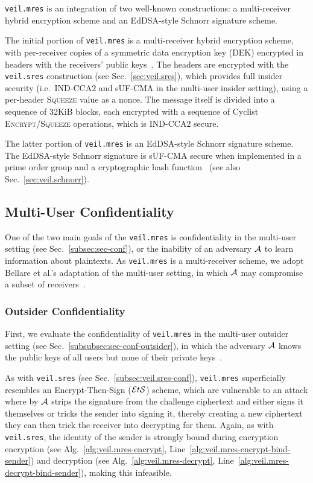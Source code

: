 \texttt{veil.mres} is an integration of two well-known constructions: a multi-receiver hybrid encryption scheme and an
EdDSA-style Schnorr signature scheme.

The initial portion of \texttt{veil.mres} is a multi-receiver hybrid encryption scheme, with per-receiver copies of a
symmetric data encryption key \@(DEK) encrypted in headers with the receivers' public
keys~\cite{kurosawa2002, bellare2003, bellare2007, rfc4880}\@.
The headers are encrypted with the \texttt{veil.sres} construction (see Sec.~\ref{sec:veil.sres}), which provides full
insider security (i.e.\ IND-CCA2 and sUF-CMA in the multi-user insider setting), using a per-header \textsc{Squeeze}
value as a nonce.
The message itself is divided into a sequence of 32KiB blocks, each encrypted with a sequence of Cyclist
\textsc{Encrypt}\@/\textsc{Squeeze} operations, which is IND-CCA2 secure.

The latter portion of \texttt{veil.mres} is an EdDSA-style Schnorr signature scheme.
The EdDSA-style Schnorr signature is sUF-CMA secure when implemented in a prime order group and a cryptographic hash
function~\cite{brendel2021, chalkias2020, pointcheval2000, neven2009} \@(see also Sec.~\ref{sec:veil.schnorr})\@.

\subsection{Multi-User Confidentiality}\label{subsec:veil.mres-conf}

One of the two main goals of the \texttt{veil.mres} is confidentiality in the multi-user setting
(see Sec.~\ref{subsec:sec-conf}), or the inability of an adversary $\mathcal{A}$ to learn information about plaintexts.
As \texttt{veil.mres} is a multi-receiver scheme, we adopt Bellare et al.'s adaptation of the multi-user
setting, in which $\mathcal{A}$ may compromise a subset of receivers~\cite{bellare2007}\@.

\subsubsection{Outsider Confidentiality}

First, we evaluate the confidentiality of \texttt{veil.mres} in the multi-user outsider setting
(see Sec.~\ref{subsubsec:sec-conf-outsider}), in which the adversary $\mathcal{A}$ knows the public keys of all users but
none of their private keys~\cite[p. 44]{baek2010}\@.

As with \texttt{veil.sres} \@(see Sec.~\ref{subsec:veil.sres-conf})\@, \texttt{veil.mres} superficially resembles an
Encrypt-Then-Sign ($\mathcal{E}t\mathcal{S}$) scheme, which are vulnerable to an attack where by $\mathcal{A}$ strips the signature from the
challenge ciphertext and either signs it themselves or tricks the sender into signing it, thereby creating a new
ciphertext they can then trick the receiver into decrypting for them.
Again, as with \texttt{veil.sres}\@, the identity of the sender is strongly bound during encryption
encryption (see Alg.~\ref{alg:veil.mres-encrypt}, Line~\ref{alg:veil.mres-encrypt-bind-sender}) and decryption
(see Alg.~\ref{alg:veil.mres-decrypt}, Line~\ref{alg:veil.mres-decrypt-bind-sender}), making this infeasible.

